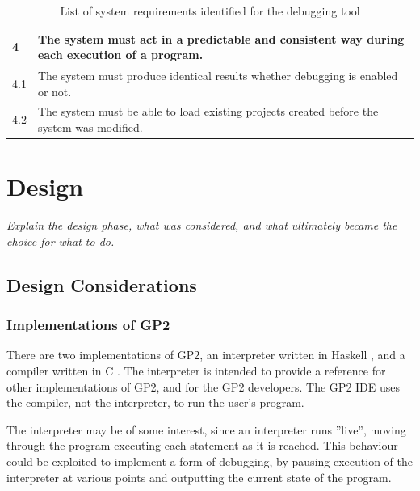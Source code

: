 \documentclass[authoryearcitations]{UoYCSproject}
\begin{document}
\begin{table}[tbp]
\begin{tabularx}{\linewidth}{|l|X|}
        4    &  The system must act in a predictable and consistent way during
                each execution of a program. \\ \hline
        4.1  &  The system must produce identical results whether debugging is
                enabled or not. \\ \hline
        4.2  &  The system must be able to load existing projects created before
                the system was modified. \\ \hline
    \end{tabularx}
    \caption{List of system requirements identified for the debugging tool}
    \label{tab:SystemRequirements}
\end{table}

\clearpage


\chapter{Design}
\label{cha:Design}

\emph{Explain the design phase, what was considered, and what ultimately 
became the choice for what to do.}


\section{Design Considerations}

\subsection{Implementations of GP2}
\label{sec:ImplementationsOfGP2}

There are two implementations of GP2, an interpreter written in Haskell
\citep{bak2015,GP2Interpreter}, and a compiler written in C
\citep{bak2015,GP2Compiler}. The interpreter is intended to provide a
reference for other implementations of GP2, and for the GP2 developers. The
GP2 IDE uses the compiler, not the interpreter, to run the user's program.

The interpreter may be of some interest, since an interpreter runs ''live'',
moving through the program executing each statement as it is reached. This
behaviour could be exploited to implement a form of debugging, by pausing
execution of the interpreter at various points and outputting the current state
of the program.
\end{document}
